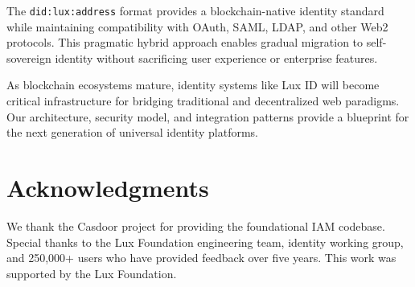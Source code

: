 \documentclass[11pt,a4paper]{article}
\begin{document}
The \texttt{did:lux:address} format provides a blockchain-native identity standard while maintaining compatibility with OAuth, SAML, LDAP, and other Web2 protocols. This pragmatic hybrid approach enables gradual migration to self-sovereign identity without sacrificing user experience or enterprise features.

As blockchain ecosystems mature, identity systems like Lux ID will become critical infrastructure for bridging traditional and decentralized web paradigms. Our architecture, security model, and integration patterns provide a blueprint for the next generation of universal identity platforms.

\section*{Acknowledgments}

We thank the Casdoor project for providing the foundational IAM codebase. Special thanks to the Lux Foundation engineering team, identity working group, and 250,000+ users who have provided feedback over five years. This work was supported by the Lux Foundation.
\end{document}
